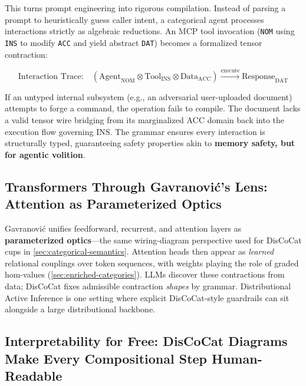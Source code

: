 \documentclass[
]{article}
\begin{document}
This turns prompt engineering into rigorous compilation. Instead of
parsing a prompt to heuristically guess caller intent, a categorical
agent processes interactions strictly as algebraic reductions. An MCP
tool invocation \citep{anthropic2024mcp} (\texttt{NOM} using
\texttt{INS} to modify \texttt{ACC} and yield abstract \texttt{DAT})
becomes a formalized tensor contraction:

\begin{equation}
\text{Interaction Trace:} \quad \left( \text{Agent}_{\text{NOM}} \otimes \text{Tool}_{\text{INS}} \otimes \text{Data}_{\text{ACC}} \right) \xrightarrow{\text{execute}} \text{Response}_{\text{DAT}}
\label{eq:ai-interaction-trace}
\end{equation}

If an untyped internal subsystem (e.g., an adversarial user-uploaded
document) attempts to forge a command, the operation fails to compile.
The document lacks a valid tensor wire bridging from its marginalized
\(\text{ACC}\) domain back into the execution flow governing
\(\text{INS}\). The grammar ensures every interaction is structurally
typed, guaranteeing safety properties akin to \textbf{memory safety, but
for agentic volition}.

\subsection{Transformers Through Gavranović's Lens: Attention as
Parameterized
Optics}\label{transformers-through-gavranoviux107s-lens-attention-as-parameterized-optics}

Gavranović
\citetext{\citeyear{gavranovic2024thesis}; \citeyear{gavranovic2024categorical}}
unifies feedforward, recurrent, and attention layers as
\textbf{parameterized optics}---the same wiring-diagram perspective used
for DisCoCat cups in \autoref{sec:categorical-semantics}. Attention
heads then appear as \emph{learned} relational couplings over token
sequences, with weights playing the role of graded hom-values
(\autoref{sec:enriched-categories}). LLMs discover these contractions
from data; DisCoCat fixes admissible contraction \emph{shapes} by
grammar. Distributional Active Inference \citep{akgul2026distributional}
is one setting where explicit DisCoCat-style guardrails can sit
alongside a large distributional backbone.

\subsection{Interpretability for Free: DisCoCat Diagrams Make Every
Compositional Step
Human-Readable}\label{interpretability-for-free-discocat-diagrams-make-every-compositional-step-human-readable}
\end{document}

